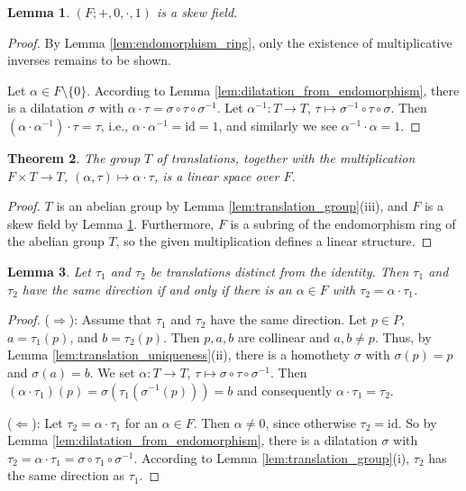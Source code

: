 \documentclass[11pt,a4paper]{article}
\newtheorem{theorem}{Theorem}[section]
\newtheorem{lemma}[theorem]{Lemma}
\begin{document}
\begin{lemma} \label{lem:skew_field}
$(F; +, 0, \cdot, 1)$ is a skew field.
\end{lemma}

\begin{proof}
By Lemma \ref{lem:endomorphism_ring}, only the existence of multiplicative inverses remains to be shown.

Let $\alpha \in F \setminus \{0\}$. According to Lemma \ref{lem:dilatation_from_endomorphism}, there is a dilatation $\sigma$ with $\alpha \cdot \tau = \sigma \circ \tau \circ \sigma^{-1}$. Let $\alpha^{-1}: T \to T$, $\tau \mapsto \sigma^{-1} \circ \tau \circ \sigma$. Then $(\alpha \cdot \alpha^{-1}) \cdot \tau = \tau$, i.e., $\alpha \cdot \alpha^{-1} = \text{id} = 1$, and similarly we see $\alpha^{-1} \cdot \alpha = 1$.
\end{proof}

\begin{theorem} \label{thm:vector_space}
The group $T$ of translations, together with the multiplication $F \times T \to T$, $(\alpha, \tau) \mapsto \alpha \cdot \tau$, is a linear space over $F$.
\end{theorem}

\begin{proof}
$T$ is an abelian group by Lemma \ref{lem:translation_group}(iii), and $F$ is a skew field by Lemma \ref{lem:skew_field}. Furthermore, $F$ is a subring of the endomorphism ring of the abelian group $T$, so the given multiplication defines a linear structure.
\end{proof}

\begin{lemma} \label{lem:translation_direction}
Let $\tau_1$ and $\tau_2$ be translations distinct from the identity. Then $\tau_1$ and $\tau_2$ have the same direction if and only if there is an $\alpha \in F$ with $\tau_2 = \alpha \cdot \tau_1$.
\end{lemma}

\begin{proof}
($\Rightarrow$): Assume that $\tau_1$ and $\tau_2$ have the same direction. Let $p \in P$, $a = \tau_1(p)$, and $b = \tau_2(p)$. Then $p, a, b$ are collinear and $a, b \neq p$. Thus, by Lemma \ref{lem:translation_uniqueness}(ii), there is a homothety $\sigma$ with $\sigma(p) = p$ and $\sigma(a) = b$. We set $\alpha: T \to T$, $\tau \mapsto \sigma \circ \tau \circ \sigma^{-1}$. Then $(\alpha \cdot \tau_1)(p) = \sigma(\tau_1(\sigma^{-1}(p))) = b$ and consequently $\alpha \cdot \tau_1 = \tau_2$.

($\Leftarrow$): Let $\tau_2 = \alpha \cdot \tau_1$ for an $\alpha \in F$. Then $\alpha \neq 0$, since otherwise $\tau_2 = \text{id}$. So by Lemma \ref{lem:dilatation_from_endomorphism}, there is a dilatation $\sigma$ with $\tau_2 = \alpha \cdot \tau_1 = \sigma \circ \tau_1 \circ \sigma^{-1}$. According to Lemma \ref{lem:translation_group}(i), $\tau_2$ has the same direction as $\tau_1$.
\end{proof}
\end{document}
